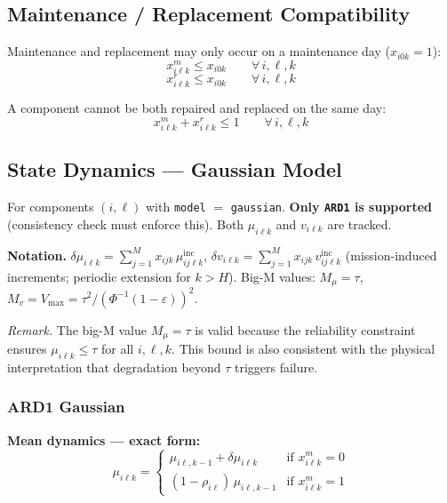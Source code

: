 \documentclass[11pt,a4paper]{article}
\begin{document}
\subsection{Maintenance / Replacement Compatibility}

Maintenance and replacement may only occur on a maintenance day ($x_{i0k} = 1$):
\begin{equation}
  x^m_{i\ell k} \leq x_{i0k} \qquad \forall\, i,\ell,k
\end{equation}
\begin{equation}
  x^r_{i\ell k} \leq x_{i0k} \qquad \forall\, i,\ell,k
\end{equation}

A component cannot be both repaired and replaced on the same day:
\begin{equation}
  x^m_{i\ell k} + x^r_{i\ell k} \leq 1 \qquad \forall\, i,\ell,k
\end{equation}

\subsection{State Dynamics --- Gaussian Model}
\label{sec:dyn_gaussian}

For components $(i,\ell)$ with \texttt{model} $=$ \texttt{gaussian}.
\textbf{Only \texttt{ARD1} is supported} (consistency check must enforce this).
Both $\mu_{i\ell k}$ and $v_{i\ell k}$ are tracked.

\textbf{Notation.}
$\delta\mu_{i\ell k} = \sum_{j=1}^{M} x_{ijk}\,\mu^{\mathrm{inc}}_{ij\ell k}$,
$\delta v_{i\ell k} = \sum_{j=1}^{M} x_{ijk}\,v^{\mathrm{inc}}_{ij\ell k}$
(mission-induced increments; periodic extension for $k>H$).
Big-M values: $M_\mu = \tau$, $M_v = V_{\max} = \tau^2/(\Phi^{-1}(1-\varepsilon))^2$.

\emph{Remark.} The big-M value $M_\mu = \tau$ is valid because the reliability
constraint ensures $\mu_{i\ell k} \leq \tau$ for all $i, \ell, k$.
This bound is also consistent with the physical interpretation that degradation
beyond $\tau$ triggers failure.

\subsubsection{ARD1 Gaussian}

\textbf{Mean dynamics --- exact form:}
\begin{equation}
  \mu_{i\ell k} = \begin{cases}
    \mu_{i\ell,k-1} + \delta\mu_{i\ell k} & \text{if } x^m_{i\ell k} = 0 \\
    (1-\rho_{i\ell})\,\mu_{i\ell,k-1} & \text{if } x^m_{i\ell k} = 1
  \end{cases}
\end{equation}
\end{document}
